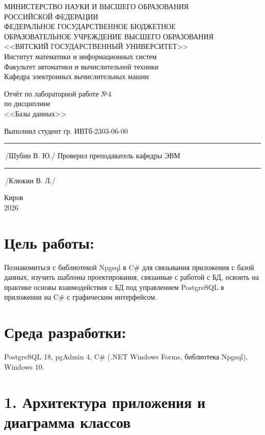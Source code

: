 \documentclass[oneside,a4paper,14pt]{extarticle}
\begin{document}
	\sloppy
	\newpage\thispagestyle{empty}
	\begin{center}
		МИНИСТЕРСТВО НАУКИ И ВЫСШЕГО ОБРАЗОВАНИЯ\\
		РОССИЙСКОЙ ФЕДЕРАЦИИ\\
		ФЕДЕРАЛЬНОЕ ГОСУДАРСТВЕННОЕ БЮДЖЕТНОЕ\\
		ОБРАЗОВАТЕЛЬНОЕ УЧРЕЖДЕНИЕ ВЫСШЕГО ОБРАЗОВАНИЯ\\
		<<ВЯТСКИЙ ГОСУДАРСТВЕННЫЙ УНИВЕРСИТЕТ>>\\
		Институт математики и информационных систем\\
		Факультет автоматики и вычислительной техники\\
		Кафедра электронных вычислительных машин
	\end{center}
	\vspace{20mm}
	\begin{center}
		Отчёт по лабораторной работе №4\\
		по дисциплине\\
		<<Базы данных>>\\
	\end{center}
	\vspace{48mm}
	\noindent
	Выполнил студент гр. ИВТб-2303-06-00 \hfill \rule[-0,5mm]{30mm}{0.15mm}\,/Шубин В. Ю./
	\newline
	Проверил преподаватель кафедры ЭВМ \hfill \rule[-0,5mm]{30mm}{0.15mm}\,/Клюкин В. Л./
	\vfill
	\begin{center}
		Киров\\
		2026
	\end{center}
	\newpage
	\thispagestyle{empty}
	\section*{Цель работы:} Познакомиться с библиотекой Npgsql в C\# для связывания приложения с базой данных, изучить шаблоны проектирования, связанные с работой с БД, освоить на практике основы взаимодействия с БД под управлением PostgreSQL в приложении на C\# с графическим интерфейсом.
	
	\section*{Среда разработки:} PostgreSQL 18, pgAdmin 4, C\# (.NET Windows Forms, библиотека Npgsql), Windows 10.
	
	\newpage
	
	\section*{1. Архитектура приложения и диаграмма классов}
	
\end{document}
